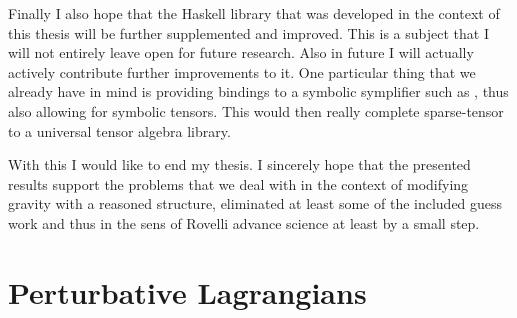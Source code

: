 \documentclass[a4paper,12pt, DIV=14, BCOR=5mm, twoside, headsepline, numbers=noenddot]{scrbook}
\begin{document}
Finally I also hope that the Haskell library that was developed in the context of this thesis will be further supplemented and improved. This is a subject that I will not entirely leave open for future research. Also in future I will actually actively contribute further improvements to it. One particular thing that we already have in mind is providing bindings to a symbolic symplifier such as \cite{SymPy}, thus also allowing for symbolic tensors. This would then really complete sparse-tensor to a universal tensor algebra library.

With this I would like to end my thesis. I sincerely hope that the presented results support the problems that we deal with in the context of modifying gravity with a reasoned structure, eliminated at least some of the included guess work and thus in the sens of Rovelli advance science at least by a small step.
\appendix

\chapter{Perturbative Lagrangians}
\end{document}
